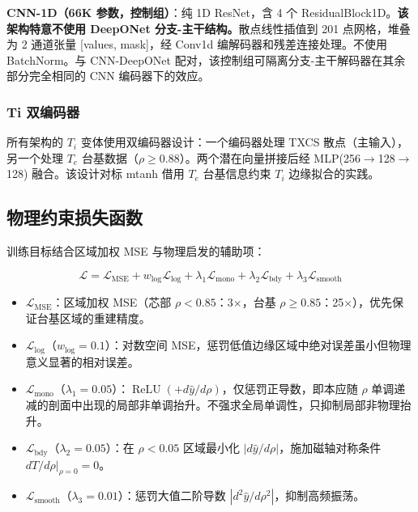\documentclass[a4paper,12pt]{ctexart}
\begin{document}
\textbf{CNN-1D（66K 参数，控制组）}：纯 1D ResNet，含 4 个 ResidualBlock1D。\textbf{该架构特意不使用 DeepONet 分支-主干结构。}散点线性插值到 201 点网格，堆叠为 2 通道张量 [values, mask]，经 Conv1d 编解码器和残差连接处理。不使用 BatchNorm。与 CNN-DeepONet 配对，该控制组可隔离分支-主干解码器在其余部分完全相同的 CNN 编码器下的效应。

\subsubsection{Ti 双编码器}

所有架构的 $T_i$ 变体使用双编码器设计：一个编码器处理 TXCS 散点（主输入），另一个处理 $T_e$ 台基数据（$\rho \geq 0.88$）。两个潜在向量拼接后经 MLP(256$\to$128$\to$128) 融合。该设计对标 mtanh 借用 $T_e$ 台基信息约束 $T_i$ 边缘拟合的实践。

\subsection{物理约束损失函数}

训练目标结合区域加权 MSE 与物理启发的辅助项：

\begin{equation}
\mathcal{L} = \mathcal{L}_{\text{MSE}} + w_{\log} \mathcal{L}_{\log} + \lambda_1 \mathcal{L}_{\text{mono}} + \lambda_2 \mathcal{L}_{\text{bdy}} + \lambda_3 \mathcal{L}_{\text{smooth}}
\label{eq:loss}
\end{equation}

\begin{itemize}
    \item $\mathcal{L}_{\text{MSE}}$：区域加权 MSE（芯部 $\rho < 0.85$：3$\times$，台基 $\rho \geq 0.85$：25$\times$），优先保证台基区域的重建精度。
    \item $\mathcal{L}_{\log}$（$w_{\log}=0.1$）：对数空间 MSE，惩罚低值边缘区域中绝对误差虽小但物理意义显著的相对误差。
    \item $\mathcal{L}_{\text{mono}}$（$\lambda_1=0.05$）：$\operatorname{ReLU}(+d\hat{y}/d\rho)$，仅惩罚正导数，即本应随 $\rho$ 单调递减的剖面中出现的局部非单调抬升。不强求全局单调性，只抑制局部非物理抬升。
    \item $\mathcal{L}_{\text{bdy}}$（$\lambda_2=0.05$）：在 $\rho < 0.05$ 区域最小化 $|d\hat{y}/d\rho|$，施加磁轴对称条件 $dT/d\rho|_{\rho=0} = 0$。
    \item $\mathcal{L}_{\text{smooth}}$（$\lambda_3=0.01$）：惩罚大值二阶导数 $|d^2\hat{y}/d\rho^2|$，抑制高频振荡。
\end{itemize}
\end{document}

